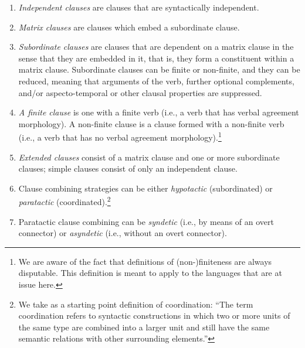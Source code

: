 \documentclass[output=paper,colorlinks,citecolor=brown]{langscibook}
\begin{document}
\begin{enumerate}

\item \textit{Independent clauses} are clauses that are syntactically independent. 

\item \textit{Matrix clauses} are clauses which embed a subordinate clause.

\item \textit{Subordinate clauses} are clauses that are dependent on a matrix clause in the sense that they are embedded in it, that is, they form a constituent within a matrix clause. Subordinate clauses can be finite or non-finite, and they can be reduced, meaning that arguments of the verb, further optional complements, and/or aspecto-temporal or other clausal properties are suppressed. 

\item \textit{A finite clause} is one with a finite verb (i.e., a verb that has verbal agreement morphology). A non-finite clause is a clause formed with a non-finite verb (i.e., a verb that has no verbal agreement morphology).\footnote{We are aware of the fact that definitions of (non-)finiteness are always disputable. This definition is meant to apply to the languages that are at issue here.}

\item \textit{Extended clauses} consist of a matrix clause and one or more subordinate clauses; simple clauses consist of only an independent clause.

\item Clause combining strategies can be either \textit{hypotactic }(subordinated) or \textit{paratactic} (coordinated).\footnote{We take as a starting point  definition of coordination: “The term coordination refers to syntactic constructions in which two or more units of the same type are combined into a larger unit and still have the same semantic relations with other surrounding elements.”}

\item Paratactic clause combining can be \textit{syndetic} (i.e., by means of an overt connector) or \textit{asyndetic} (i.e., without an overt connector). 

\end{enumerate}
\end{document}
